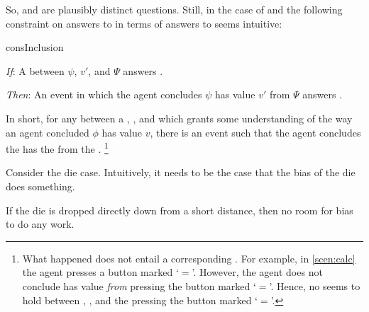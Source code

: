 \begin{note}
  So, \qWhy{} and \qHow{} are plausibly distinct questions.
  Still, in the case of \qWhy{} and \qHow{} the following constraint on answers to \qWhy{} in terms of answers to \qHow{} seems intuitive:

  \begin{constraint}{consInclusion}{\issueInclusion{}}
    \mbox{ }
    \vspace{-\baselineskip}
    \begin{itenum}
    \item[\emph{If}:]
      A \ros{} between \(\psi\), \(v'\), and \(\Psi\) answers \qWhy{}.
    \item[\emph{Then}:]
      An event in which the agent concludes \(\psi\) has value \(v'\) from \(\Psi\) answers \qHow{}.
    \end{itenum}
    \vspace{-\baselineskip}
  \end{constraint}

  \noindent%
  In short, for any \ros{} between a , , and \pool{} which grants some understanding of the way an agent concluded \(\phi\) has value \(v\), there is an event such that the agent concludes the \prop{} has the \val{} from the \pool{}.%
  \footnote{
    What happened does not entail a corresponding \ros{}.
    For example, in \autoref{scen:calc} the agent presses a button marked `\(=\)'.
    However, the agent does not conclude \propM{\gistCalcEq{}} has value  \emph{from} pressing the button marked `\(=\)'.
    Hence, no \ros{} seems to hold between \propM{\gistCalcEq{}}, , and the pressing the button marked `\(=\)'.
  }
\end{note}


\begin{note}
  \color{blue}
  Consider the die case.
  Intuitively, it needs to be the case that the bias of the die does something.

  If the die is dropped directly down from a short distance, then no room for bias to do any work.
\end{note}


